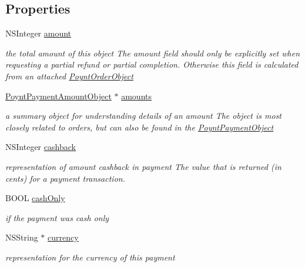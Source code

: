 \subsection*{Properties}
\begin{DoxyCompactItemize}
\item 
N\+S\+Integer \hyperlink{interface_poynt_payment_object_a6ff5079a7aa518c578773da69959732d}{amount}
\begin{DoxyCompactList}\small\item\em the total amount of this object  The amount field should only be explicitly set when requesting a partial refund or partial completion. Otherwise this field is calculated from an attached \hyperlink{interface_poynt_order_object}{Poynt\+Order\+Object} \end{DoxyCompactList}\item 
\hyperlink{interface_poynt_payment_amount_object}{Poynt\+Payment\+Amount\+Object} $\ast$ \hyperlink{interface_poynt_payment_object_a24782f14a239c62d29bf0389fb7fdf8d}{amounts}
\begin{DoxyCompactList}\small\item\em a summary object for understanding details of an amount  The object is most closely related to orders, but can also be found in the \hyperlink{interface_poynt_payment_object}{Poynt\+Payment\+Object} \end{DoxyCompactList}\item 
N\+S\+Integer \hyperlink{interface_poynt_payment_object_a84de6fd790c3129d6d0a271d915d442a}{cashback}
\begin{DoxyCompactList}\small\item\em representation of amount cashback in payment  The value that is returned (in cents) for a payment transaction. \end{DoxyCompactList}\item 
B\+O\+OL \hyperlink{interface_poynt_payment_object_a7b74d30854a9218712b55c79cd7786f0}{cash\+Only}
\begin{DoxyCompactList}\small\item\em if the payment was cash only \end{DoxyCompactList}\item 
N\+S\+String $\ast$ \hyperlink{interface_poynt_payment_object_a71a9104f71558df8791cedc5e81941a3}{currency}
\begin{DoxyCompactList}\small\item\em representation for the currency of this payment \end{DoxyCompactList}\item 

\end{DoxyCompactItemize}
